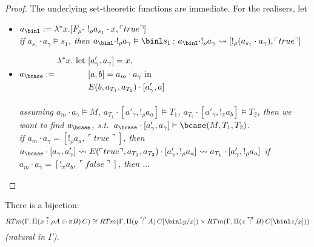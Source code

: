 \documentclass[12pt,a4paper]{article}
\begin{document}
\begin{proof}
The underlying set-theoretic functions are immediate. For the realisers, let
\begin{itemize}[noitemsep]
  \item $a_\binl \define \lambda^* x . [ F_\rho \cdot\ !_\rho a_{s_1}\cdot x , \ulcorner true \urcorner]$\\
  
  \emph{if $a_{s_1}\cdot {a_\gamma} \vDash  s_1$, then $a_\binl \cdot !_\rho a_\gamma \vDash \binl s_1$; $a_\binl \cdot !_\rho a_\gamma \leadsto [!_\rho (a_{s_1} \cdot a_\gamma) , \ulcorner true \urcorner]$}\\
  
  \item $a_\bcase \define 
  \begin{aligned}
  \lambda^* x .\text{ let } & [a'_\gamma, a_\gamma] = x, \\
   &[a , b] = a_m \cdot a_\gamma \text{ in }\\
   & E(b, a_{T_1}, a_{T_2}) \cdot [ a'_\gamma , a]      
  \end{aligned}$\\
  \\
  \emph{assuming $a_m \cdot a_\gamma \vDash M$,  $a_{T_1} \cdot [a'_\gamma, !_\rho a_a] \vDash T_1$, $a_{T_2} \cdot [a'_\gamma, !_\pi a_b] \vDash T_2$, then we want to find $a_\bcase$, s.t.\ $a_\bcase\cdot [a'_\gamma, a_\gamma] \vDash \bcase(M, T_1, T_2)$.\\ 
  \subitem if $a_m \cdot a_\gamma = [!_\rho a_a , \ulcorner true \urcorner]$, then $a_\bcase \cdot [a_\gamma , a'_\gamma] \leadsto E(\ulcorner true \urcorner, a_{T_1}, a_{T_2})\cdot [a'_
  \gamma, !_\rho a_a] \leadsto a_{T_1} \cdot [a'_\gamma, !_\rho a_a]$
  \subitem if $a_m \cdot a_\gamma = [!_\pi a_b, \ulcorner false \urcorner]$, then $\dots$} 
\end{itemize}
\end{proof}

\begin{claim}
  There is a bijection:
  $$RTm(\Gamma, \Pi (x \of{\tau} \rho A \oplus \pi B)\, C) \cong RTm(\Gamma, \Pi (y \of{\tau\rho}A)\, C[\binl y /x]) \times RTm(\Gamma, \Pi(z \of{\tau\pi} B)\, C[\binl z /x]))$$
  \textit{(natural in $\Gamma$).}
\end{claim}
\end{document}
